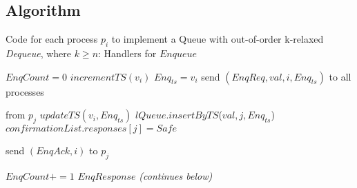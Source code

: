\documentclass[a4paper,USenglish]{lipics-v2021} %
\begin{document}
\subsection{Algorithm}

\begin{algorithm}
  \caption{Code for each process $p_i$ to implement a Queue with out-of-order k-relaxed \textit{Dequeue}, where $k \geq n$: Handlers for $Enqueue$}\label{alg:relaxed}
  \begin{algorithmic}[1]
      \State $EnqCount = 0$
      \State $incrementTS(v_i)$
      \State $Enq_{ts} = v_i$
      \State send $(EnqReq, val, i, Enq_{ts})$ to all processes
    \EndFunction

     from $p_j$
      \State $updateTS(v_i, Enq_{ts})$
      \State $lQueue.insertByTS$($val, j, Enq_{ts}$)
          \State $confirmationList.responses[j] = Safe$
        \EndIf
      \EndFor

      \State send $(EnqAck, i)$ to $p_j$
    \EndFunction

      \State $EnqCount += 1$
        \Return $EnqResponse$
      \EndIf
    \EndFunction
    \Statex
    \Statex \emph{(continues below)}
  \end{algorithmic}
\end{algorithm}
\end{document}
